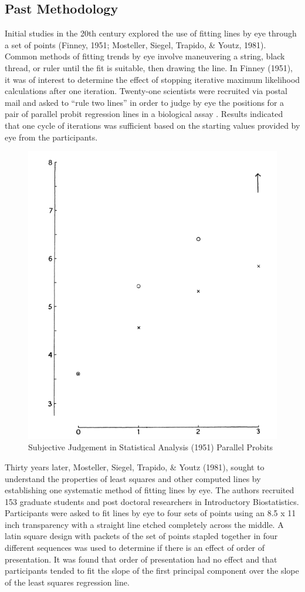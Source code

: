 \documentclass[print]{nuthesis}
\begin{document}
\hypertarget{past-methodology}{%
\subsection{Past Methodology}\label{past-methodology}}

Initial studies in the 20th century explored the use of fitting lines by eye through a set of points (Finney, 1951; Mosteller, Siegel, Trapido, \& Youtz, 1981).
Common methods of fitting trends by eye involve maneuvering a string, black thread, or ruler until the fit is suitable, then drawing the line.
In Finney (1951), it was of interest to determine the effect of stopping iterative maximum likelihood calculations after one iteration. Twenty-one scientists were recruited via postal mail and asked to ``rule two lines'' in order to judge by eye the positions for a pair of parallel probit regression lines in a biological assay .
Results indicated that one cycle of iterations was sufficient based on the starting values provided by eye from the participants.

\begin{figure}[tbp]

{\centering \includegraphics[width=0.5\linewidth,]{images/subjective-judgement-plot} 

}

\caption{Subjective Judgement in Statistical Analysis (1951) Parallel Probits}\label{fig:subjective-judgement}
\end{figure}

Thirty years later, Mosteller, Siegel, Trapido, \& Youtz (1981), sought to understand the properties of least squares and other computed lines by establishing one systematic method of fitting lines by eye.
The authors recruited 153 graduate students and post doctoral researchers in Introductory Biostatistics.
Participants were asked to fit lines by eye to four sets of points  using an 8.5 x 11 inch transparency with a straight line etched completely across the middle.
A latin square design with packets of the set of points stapled together in four different sequences was used to determine if there is an effect of order of presentation.
It was found that order of presentation had no effect and that participants tended to fit the slope of the first principal component over the slope of the least squares regression line.
\end{document}
